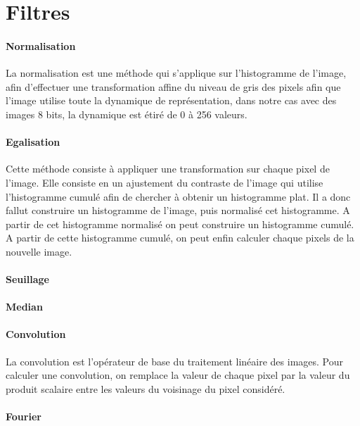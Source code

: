 \section{Filtres}
	
	\paragraph{Normalisation}

	La normalisation est une méthode qui s'applique sur l'histogramme de l'image, afin d'effectuer une transformation affine du niveau de gris des pixels afin que l'image utilise toute la dynamique de représentation, dans notre cas avec des images 8 bits, la dynamique est étiré de 0 à 256 valeurs.


	\paragraph{Egalisation}

	Cette méthode consiste à appliquer une transformation sur chaque pixel de l'image. Elle consiste en un ajustement du contraste de l'image qui utilise l'histogramme cumulé afin de chercher à obtenir un histogramme plat. Il a donc fallut construire un histogramme de l'image, puis normalisé cet histogramme. A partir de cet histogramme normalisé on peut construire un histogramme cumulé. A partir de cette histogramme cumulé, on peut enfin calculer chaque pixels de la nouvelle image.
	
	\paragraph{Seuillage}
	
	\paragraph{Median}
	
	\paragraph{Convolution}
	La convolution est l'opérateur de base du traitement linéaire des images. Pour calculer une convolution, on remplace la valeur de chaque pixel par la valeur du produit scalaire entre les valeurs du voisinage du pixel considéré.
	
	\paragraph{Fourier}